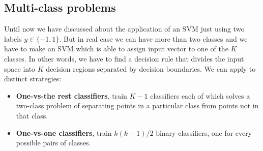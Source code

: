 \subsection{Multi-class problems}
Until now we have discussed about the application of an SVM just using two labels $y \in\{-1,1\}$. But in real case we can have more than two classes and we have to make an SVM which is able to assign input vector to one of the $K$ classes. In other words, we have to find a decision rule that divides the input space into $K$ decision regions separated by decision boundaries. 
We can apply to distinct strategies:
\begin{itemize}
	\item \textbf{One-vs-the rest classifiers}, train $K-1$ classifiers each of which solves a two-class problem of separating points in a particular class from points not in that class.
	
	\item \textbf{One-vs-one classifiers}, train $k(k-1)/2$ binary classifiers, one for every possible pairs of classes.
	
\end{itemize}

